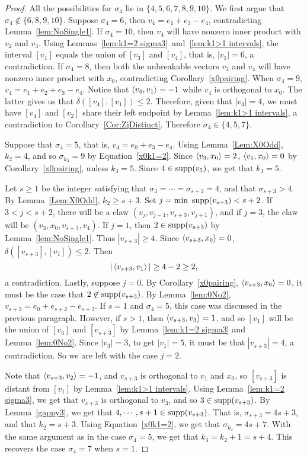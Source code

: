 \begin{proof}
All the possibilities for $\sigma_4$ lie in $\{ 4,5,6,7,8,9,10\}$. We first argue that $\sigma_4\not\in\{6, 8, 9, 10\}$. Suppose $\sigma_4=6$, then $v_4=e_1+e_3-e_4$, contradicting Lemma~\ref{lem:NoSingle1}. If $\sigma_4=10$, then $v_4$ will have nonzero inner product with $v_2$ and $v_3$.  Using Lemmas~\ref{lem:k1=2 sigma3}~and~\ref{lem:k1>1 intervals}, the interval $[v_1]$ equals the union of $[v_3]$ and $[v_4]$, that is, $|v_1|=6$, a contradiction. If $\sigma_4=8$, then both the unbreakable vectors $v_3$ and $v_4$ will have nonzero inner product with $x_0$, contradicting Corollary~\ref{x0pairing}. When $\sigma_4=9$, $v_4=e_1+e_2+e_3-e_4$. Notice that $\left\langle v_4 , v_1 \right\rangle=-1$ while $v_4$ is orthogonal to $x_0$. The latter gives us that $\delta([v_4], [v_1])\le 2$. Therefore, given that $|v_4|=4$, we must have $[v_4]$ and $[v_2]$ share their left endpoint by Lemma~\ref{lem:k1>1 intervals}, a contradiction to Corollary~\ref{Cor:ZjDistinct}. Therefore $\sigma_4\in \{4, 5, 7\}$.

Suppose that $\sigma_4=5$, that is, $v_4=e_0+e_3-e_4$. Using Lemma~\ref{Lem:X0Odd}, $k_2=4$, and so $\sigma_{k_3}=9$ by Equation~\eqref{x0k1=2}. Since $\left\langle v_3 , x_0 \right\rangle=2$, $\left\langle v_5 , x_0 \right\rangle=0$ by Corollary~\ref{x0pairing}, unless $k_3=5$. Since $4\in \operatorname{supp}(v_5)$, we get that $k_3=5$.

Let $s\ge 1$ be the integer satisfying that $\sigma_3=\cdots =\sigma_{s+2}=4$, and that $\sigma_{s+3}>4$. By Lemma~\ref{Lem:X0Odd}, $k_2\ge s+3$. Set $j=\text{min }\operatorname{supp}(v_{s+3})<s+2$. If $3<j<s+2$, there will be a claw $(v_j, v_{j-1}, v_{s+3}, v_{j+1})$, and if $j=3$, the claw will be $(v_3, x_0, v_{s+3}, v_4)$. If $j=1$, then $2\in\operatorname{supp}(v_{s+3})$ by Lemma~\ref{lem:NoSingle1}. Thus $|v_{s+3}|\ge 4$. Since $\left\langle v_{s+3} , x_0 \right\rangle=0$, $\delta([v_{s+3}], [v_1])\le 2$. Then 
\[
|\left\langle v_{s+3} , v_1 \right\rangle|\ge4-2\ge 2,
\] 
a contradiction. Lastly, suppose $j=0$. By Corollary~\ref{x0pairing}, $\left\langle v_{s+3} , x_0 \right\rangle=0$, it must be the case that $2\not \in\operatorname{supp}(v_{s+3})$. By Lemma~\ref{lem:0No2}, $v_{s+3}=e_0+e_{s+2}-e_{s+3}$. If $s=1$ and $\sigma_4=5$, this case was discussed in the previous paragraph. However, if $s>1$, then $\left\langle v_{s+3} , v_3 \right\rangle=1$, and so $[v_1]$ will be the union of $[v_3]$ and $[v_{s+3}]$ by Lemma~\ref{lem:k1=2 sigma3} and Lemma~\ref{lem:0No2}. Since $|v_3|=3$, to get $|v_1|=5$, it must be that $|v_{s+3}|=4$, a contradiction. So we are left with the case $j=2$. 

Note that $\left\langle v_{s+3} , v_2 \right\rangle=-1$, and $v_{s+3}$ is orthogonal to $v_1$ and $x_0$, so $[v_{s+3}]$ is distant from $[v_1]$ by Lemma~\ref{lem:k1>1 intervals}. Using Lemma~\ref{lem:k1=2 sigma3}, we get that $v_{s+3}$ is orthogonal to $v_{3}$, and so $3\in \operatorname{supp}(v_{s+3})$. By Lemma~\ref{gappy3}, we get that $4,\cdots, s+1 \in \operatorname{supp}(v_{s+3})$. That is, $\sigma_{s+3}=4s+3$, and that $k_2=s+3$. Using Equation~\eqref{x0k1=2}, we get that $\sigma_{k_3}=4s+7$. With the same argument as in the case $\sigma_4=5$, we get that $k_3=k_2+1=s+4$. This recovers the case $\sigma_4=7$ when $s=1$. 
\end{proof}

